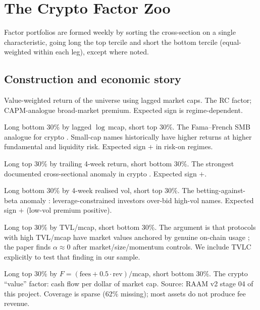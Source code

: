 \documentclass[11pt,a4paper]{article}
\begin{document}
\section{The Crypto Factor Zoo}\label{sec:zoo}

Factor portfolios are formed weekly by sorting the cross-section on a single characteristic, going long the top tercile and short the bottom tercile (equal-weighted within each leg), except where noted.

\subsection{Construction and economic story}

\begin{description}[topsep=2pt,itemsep=2pt,leftmargin=1.2em]
\item[RC --- crypto market.] Value-weighted return of the universe using lagged market caps. The \citet{hartmann2025hidden} RC factor; CAPM-analogue broad-market premium. Expected sign is regime-dependent.
\item[SMBC --- size.] Long bottom 30\% by lagged $\log$\,mcap, short top 30\%. The Fama--French SMB analogue for crypto \citep{hartmann2025hidden, famafrench1993}. Small-cap names historically have higher returns at higher fundamental and liquidity risk. Expected sign $+$ in risk-on regimes.
\item[MomC --- momentum.] Long top 30\% by trailing 4-week return, short bottom 30\%. The strongest documented cross-sectional anomaly in crypto \citep{liu2022commonrisk, jegadeeshtitman1993, carhart1997}. Expected sign $+$.
\item[VolC --- low-volatility.] Long bottom 30\% by 4-week realised vol, short top 30\%. The betting-against-beta anomaly \citep{frazzinipedersen2014}: leverage-constrained investors over-bid high-vol names. Expected sign $+$ (low-vol premium positive).
\item[TVLC --- DeFi engagement.] Long top 30\% by TVL/mcap, short bottom 30\%. The argument is that protocols with high TVL/mcap have market values anchored by genuine on-chain usage \citep{hartmann2025hidden}; the \citet{yousaf2025tvlirrelevance} paper finds $\alpha\!\approx\!0$ after market/size/momentum controls. We include TVLC explicitly to test that finding in our sample.
\item[FunC --- fundamental yield.] Long top 30\% by $F=(\text{fees}+0.5\cdot\text{rev})/\text{mcap}$, short bottom 30\%. The crypto ``value'' factor: cash flow per dollar of market cap. Source: RAAM v2 stage 04 of this project. Coverage is sparse (62\% missing); most assets do not produce fee revenue.

\end{description}
\end{document}
